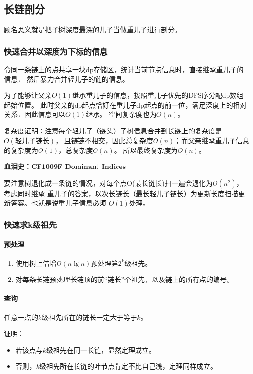 \subsection{长链剖分}
顾名思义就是把子树深度最深的儿子当做重儿子进行剖分。

\subsubsection{快速合并以深度为下标的信息}
令同一条链上的点共享一块dp存储区，统计当前节点信息时，直接继承重儿子的信息，
然后暴力合并轻儿子的链的信息。

为了能够让父亲$O(1)$继承重儿子的信息，按照重儿子优先的DFS序分配dp数组起始位置。
此时父亲的dp起点恰好在重儿子dp起点的前一位，满足深度上的相对关系，因此信息可以$O(1)$继承。
空间复杂度也为$O(n)$。

复杂度证明：注意每个轻儿子（链头）子树信息合并到长链上的复杂度是\\$O(\textrm{轻儿子链长})$，
且链链不相交，因此总复杂度$O(n)$；而父亲继承重儿子信息的复杂度为$O(1)$，总复杂度$O(n)$。
所以最终复杂度为$O(n)$。

{\bfseries
血泪史：CF1009F Dominant Indices

要注意树退化成一条链的情况，对每个点O(最长链长)扫一遍会退化为$O(n^2)$，考虑同时继承
重儿子的答案，以次长链长（最长轻儿子链长）为更新长度扫描更新答案。也就是说重儿子信息必须
$O(1)$处理。}



\subsubsection{快速求k级祖先}
\paragraph{预处理}
\begin{enumerate}
	\item 使用树上倍增$O(n\lg n)$预处理第$2^k$级祖先。
	\item 对每条长链预处理长链顶的前``链长''个祖先，以及链上的所有点的编号。
\end{enumerate}

\paragraph{查询}

\begin{theorem}\label{DBCBD}
	任意一点的$k$级祖先所在的链长一定大于等于$k$。
\end{theorem}
证明：
\begin{itemize}
	\item 若该点与$k$级祖先在同一长链，显然定理成立。
	\item 否则，$k$级祖先所在长链的叶节点肯定不比自己浅，定理同样成立。
\end{itemize}

